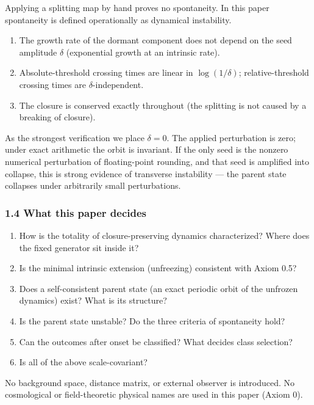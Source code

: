 \documentclass[
  a4paper,
]{article}
\providecommand{\tightlist}{%
  \setlength{\itemsep}{0pt}\setlength{\parskip}{0pt}}
\begin{document}
Applying a splitting map by hand proves no spontaneity. In this paper
spontaneity is defined operationally as dynamical instability.

\begin{enumerate}
\def\labelenumi{\arabic{enumi}.}
\tightlist
\item
  The growth rate of the dormant component does not depend on the seed
  amplitude \(\delta\) (exponential growth at an intrinsic rate).
\item
  Absolute-threshold crossing times are linear in \(\log(1/\delta)\);
  relative-threshold crossing times are \(\delta\)-independent.
\item
  The closure is conserved exactly throughout (the splitting is not
  caused by a breaking of closure).
\end{enumerate}

As the strongest verification we place \(\delta=0\). The applied
perturbation is zero; under exact arithmetic the orbit is invariant. If
the only seed is the nonzero numerical perturbation of floating-point
rounding, and that seed is amplified into collapse, this is strong
evidence of transverse instability --- the parent state collapses under
arbitrarily small perturbations.

\subsubsection{1.4 What this paper
decides}\label{what-this-paper-decides}

\begin{enumerate}
\def\labelenumi{\arabic{enumi}.}
\tightlist
\item
  How is the totality of closure-preserving dynamics characterized?
  Where does the fixed generator sit inside it?
\item
  Is the minimal intrinsic extension (unfreezing) consistent with Axiom
  0.5?
\item
  Does a self-consistent parent state (an exact periodic orbit of the
  unfrozen dynamics) exist? What is its structure?
\item
  Is the parent state unstable? Do the three criteria of spontaneity
  hold?
\item
  Can the outcomes after onset be classified? What decides class
  selection?
\item
  Is all of the above scale-covariant?
\end{enumerate}

No background space, distance matrix, or external observer is
introduced. No cosmological or field-theoretic physical names are used
in this paper (Axiom 0).
\end{document}
